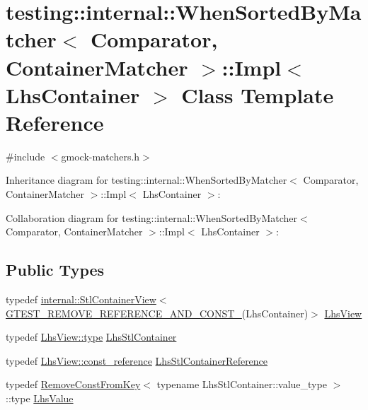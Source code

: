 \hypertarget{classtesting_1_1internal_1_1_when_sorted_by_matcher_1_1_impl}{}\section{testing\+:\+:internal\+:\+:When\+Sorted\+By\+Matcher$<$ Comparator, Container\+Matcher $>$\+:\+:Impl$<$ Lhs\+Container $>$ Class Template Reference}
\label{classtesting_1_1internal_1_1_when_sorted_by_matcher_1_1_impl}


{\ttfamily \#include $<$gmock-\/matchers.\+h$>$}



Inheritance diagram for testing\+:\+:internal\+:\+:When\+Sorted\+By\+Matcher$<$ Comparator, Container\+Matcher $>$\+:\+:Impl$<$ Lhs\+Container $>$\+:


Collaboration diagram for testing\+:\+:internal\+:\+:When\+Sorted\+By\+Matcher$<$ Comparator, Container\+Matcher $>$\+:\+:Impl$<$ Lhs\+Container $>$\+:
\subsection*{Public Types}
\begin{DoxyCompactItemize}
\item 
typedef \hyperlink{classtesting_1_1internal_1_1_stl_container_view}{internal\+::\+Stl\+Container\+View}$<$ \hyperlink{gtest-internal_8h_a874567b176266188fabfffb8393267ce}{G\+T\+E\+S\+T\+\_\+\+R\+E\+M\+O\+V\+E\+\_\+\+R\+E\+F\+E\+R\+E\+N\+C\+E\+\_\+\+A\+N\+D\+\_\+\+C\+O\+N\+S\+T\+\_\+}(Lhs\+Container)$>$ \hyperlink{classtesting_1_1internal_1_1_when_sorted_by_matcher_1_1_impl_a4c84fddfe1bf967a73e5dae1940db427}{Lhs\+View}
\item 
typedef \hyperlink{classtesting_1_1internal_1_1_stl_container_view_a2b2c63a6dcdbfe63fb0ee121ebf463ba}{Lhs\+View\+::type} \hyperlink{classtesting_1_1internal_1_1_when_sorted_by_matcher_1_1_impl_a2cb1a8d85ca2c376b6abdbcb00d84759}{Lhs\+Stl\+Container}
\item 
typedef \hyperlink{classtesting_1_1internal_1_1_stl_container_view_a9cd4f6ed689b3938cdb7b3c4cbf1b36b}{Lhs\+View\+::const\+\_\+reference} \hyperlink{classtesting_1_1internal_1_1_when_sorted_by_matcher_1_1_impl_ab5e53a762bb213ccf84299b31c825b58}{Lhs\+Stl\+Container\+Reference}
\item 
typedef \hyperlink{structtesting_1_1internal_1_1_remove_const_from_key}{Remove\+Const\+From\+Key}$<$ typename Lhs\+Stl\+Container\+::value\+\_\+type $>$\+::type \hyperlink{classtesting_1_1internal_1_1_when_sorted_by_matcher_1_1_impl_a93044f4ba53373fcfc424132b5e6c462}{Lhs\+Value}
\end{DoxyCompactItemize}
